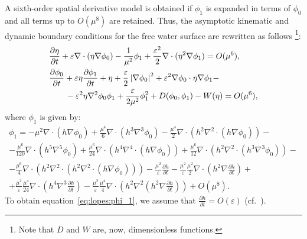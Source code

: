 A sixth-order spatial derivative model is obtained if
$\phi_1$ is expanded in terms of $\phi_0$ and all terms up
to $O(\mu^8)$ are retained.  Thus, the asymptotic kinematic
and dynamic boundary conditions for the free water surface
are rewritten as follows \footnote{Note that $D$ and $W$
  are, now, dimensionless functions.}:
\begin{subequations}\label{eq:lopes:kindyn}
\begin{align}
&\displaystyle\frac{\partial \eta}{\partial t}+\varepsilon\nabla\cdot(\eta\nabla\phi_0)-\frac{1}{\mu^2}\phi_1+
  \frac{\varepsilon^2}{2}\nabla\cdot(\eta^2\nabla\phi_1)=O(\mu^{6}),
\vspace{0.3cm}\\ &\displaystyle
\frac{\partial \phi_0}{\partial t}+\varepsilon\eta\frac{\partial \phi_1}{\partial t}+\eta +
\frac{\varepsilon}{2}
\left|\nabla\phi_0\right|^2+\varepsilon^2\nabla\phi_0\cdot\eta\nabla\phi_1-\nonumber
\\ & \displaystyle \qquad
-\varepsilon^2\eta\nabla^2\phi_0\phi_1
+\frac{\varepsilon}{2\mu^2}\phi_1^2
+D(\phi_0,\phi_1)-W(\eta) =O(\mu^{6}),
\end{align}
\end{subequations}
where $\phi_1$ is given by:
\begin{multline}\label{eq:lopes:phi_1}
\phi_1= -\mu^{2}\nabla\cdot\left(h\nabla\phi_0\right)
+\frac{\mu^{4}}{6}\nabla\cdot\left(h^3\nabla^3\phi_0\right)
-\frac{\mu^{4}}{2}\nabla\cdot\left(h^2
\nabla^2\cdot\left(h\nabla\phi_0\right)
\right)-\\ -\frac{\mu^6}{120}\nabla\cdot\left(h^5\nabla^5\phi_0\right)+
\frac{\mu^6}{24}\nabla\cdot\left(h^4\nabla^4\cdot\left(h\nabla\phi_0\right)\right)+\frac{\mu^6}{12}\nabla\cdot\left(h^2\nabla^2\cdot\left(h^3\nabla^3\phi_0\right)\right)-\\ -\frac{\mu^6}{4}\nabla\cdot\left(h^2\nabla^2\cdot\left(h^2\nabla^2\cdot\left(h\nabla\phi_0\right)\right)\right)
-\frac{\mu^2}{\varepsilon}\frac{\partial h}{\partial t}-
\frac{\mu^2}{\varepsilon}\frac{\mu^2}{2}\nabla\cdot\left(h^2\nabla\frac{\partial h}{\partial t}\right)+\\ +\frac{\mu^2}{\varepsilon}\frac{\mu^4}{24}\nabla\cdot\left(h^4\nabla^3
\frac{\partial h}{\partial t}\right)
-\frac{\mu^2}{\varepsilon}\frac{\mu^4}{4}\nabla\cdot\left(h^2\nabla^2\left(h^2\nabla\frac{\partial h}{\partial t}\right)\right)+O(\mu^{8}).
\end{multline}
To obtain equation~\eqref{eq:lopes:phi_1}, we assume that
$\displaystyle\frac{\partial h}{\partial t}=O(\varepsilon)$
(cf.~\cite{DutykhDias2007}).

